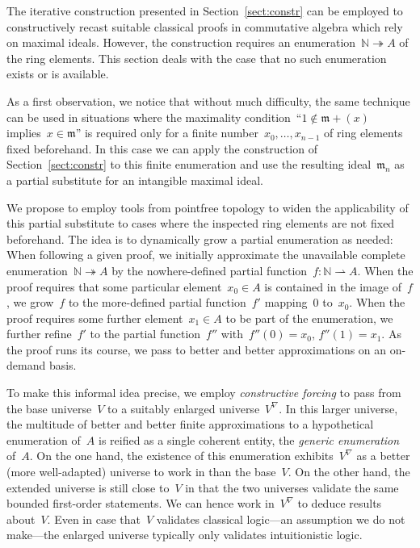 \documentclass[com,11pt,crcready]{iosart2x}
\theoremstyle{definition}
\theoremstyle{plain}
\theoremstyle{remark}
\newcommand{\mmm}{\mathfrak{m}}
\newcommand{\NN}{\mathbb{N}}
\renewcommand{\_}{\mathpunct{.}\,}
\begin{document}
The iterative construction presented in Section~\ref{sect:constr}
can be employed to constructively recast suitable classical proofs in
commutative algebra which rely on maximal ideals. However, the construction requires an enumeration~$\NN
\twoheadrightarrow A$ of the ring elements. This section deals with the case
that no such enumeration exists or is available.

As a first observation, we notice that without much difficulty, the same technique can be used in situations where the
maximality condition~``$1 \not\in \mmm + (x)$ implies~$x \in \mmm$''
is required only for a finite number~$x_0,\ldots,x_{n-1}$ of ring elements
fixed beforehand. In this case we can apply the construction of Section~\ref{sect:constr} to
this finite enumeration and use the resulting ideal~$\mmm_n$ as a partial
substitute for an intangible maximal ideal.

We propose to employ tools from pointfree topology to
widen the applicability of this partial
substitute to cases where the inspected ring elements are
not fixed beforehand. The idea is to dynamically grow a partial enumeration as
needed: When following a given proof, we initially approximate the unavailable
complete enumeration~$\NN \twoheadrightarrow A$ by the nowhere-defined partial
function~$f : \NN \rightharpoonup A$. When the proof requires
that some particular element~$x_0 \in A$ is contained in the image of~$f$, we grow~$f$ to
the more-defined partial function~$f'$ mapping~$0$ to~$x_0$. When the proof
requires some further element~$x_1 \in A$ to be part of the enumeration, we further refine~$f'$
to the partial function~$f''$ with~$f''(0) = x_0$, $f''(1) = x_1$.
As the proof runs its course, we pass to better and better approximations on an
on-demand basis.

To make this informal idea precise, we employ \emph{constructive forcing} to
pass from the base universe~$V$ to a suitably enlarged universe~$V^\nabla$. In
this larger universe, the multitude of better and better finite approximations to a
hypothetical enumeration of~$A$ is reified as a single coherent entity, the
\emph{generic enumeration} of~$A$. On the one hand, the existence of this enumeration
exhibits~$V^\nabla$ as a better (more well-adapted) universe to work in than the
base~$V$. On the other hand, the extended universe is still close to~$V$ in that the two universes
validate the same bounded first-order statements. We can hence work in~$V^\nabla$ to
deduce results about~$V$. Even in case that~$V$ validates classical logic---an
assumption we do not make---the enlarged universe typically only validates
intuitionistic logic.
\end{document}
